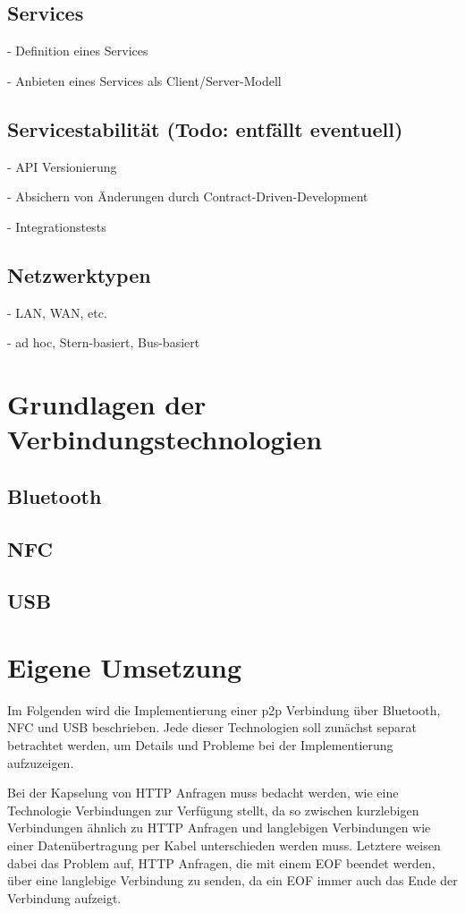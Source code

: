 \documentclass[12pt,a4paper]{article}
\begin{document}
    \subsection{Services}
    - Definition eines Services
    
    
    - Anbieten eines Services als Client/Server-Modell
    
    \subsection{Servicestabilität (Todo: entfällt eventuell)}
    - API Versionierung
    
    - Absichern von Änderungen durch Contract-Driven-Development
    
    - Integrationstests
    \subsection{Netzwerktypen}
		- LAN, WAN, etc.
		
		- ad hoc, Stern-basiert, Bus-basiert
		\section{Grundlagen der Verbindungstechnologien}
		
		\subsection{Bluetooth}
		
		\subsection{NFC}
		
		\subsection{USB}
		
    \section{Eigene Umsetzung}
        Im Folgenden wird die Implementierung einer p2p Verbindung über Bluetooth, NFC und USB beschrieben. Jede dieser Technologien soll zunächst separat betrachtet werden, um Details und Probleme bei der Implementierung aufzuzeigen.
        
        Bei der Kapselung von HTTP Anfragen muss bedacht werden, wie eine Technologie Verbindungen zur Verfügung stellt, da so zwischen kurzlebigen Verbindungen ähnlich zu HTTP Anfragen und langlebigen Verbindungen wie einer Datenübertragung per Kabel unterschieden werden muss. Letztere weisen dabei das Problem auf, HTTP Anfragen, die mit einem EOF beendet werden, über eine langlebige Verbindung zu senden, da ein EOF immer auch das Ende der Verbindung aufzeigt.
        
\end{document}
